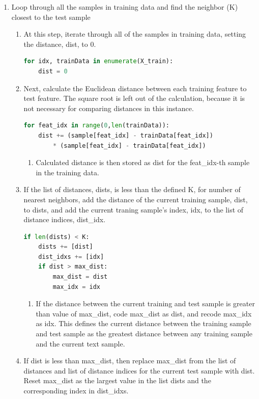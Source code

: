 \documentclass[11pt]{article}
\theoremstyle{definition}
\begin{document}
\begin{enumerate}
\begin{enumerate}
 \item Loop through all the samples in training data and find the neighbor (\textsf{K}) closest to the test sample
 \begin{enumerate}
     \item At this step, iterate through all of the samples in training data, setting the distance, \textsf{dist}, to 0.
\begin{lstlisting}[language=python, frame=single]
for idx, trainData in enumerate(X_train):
	dist = 0
\end{lstlisting}
     \item Next, calculate the Euclidean distance between each training feature to test feature. The square root is left out of the calculation, because it is not necessary for comparing distances in this instance. 
\begin{lstlisting}[language=python, frame=single]
for feat_idx in range(0,len(trainData)):
    dist += (sample[feat_idx] - trainData[feat_idx]) 
        * (sample[feat_idx] - trainData[feat_idx])
\end{lstlisting}
     \begin{enumerate}
     \item Calculated distance is then stored as \textsf{dist} for the \textsf{feat\_idx}-th sample in the training data.
     \end{enumerate}
    \item If the list of distances, \textsf{dists}, is less than the defined \textsf{K}, for number of nearest neighbors, add the distance of the current training sample, \textsf{dist}, to \textsf{dists}, and add the current traning sample's index, \textsf{idx}, to the list of distance indices, \textsf{dist\_idx}.
\begin{lstlisting}[language=python, frame=single]
if len(dists) < K:
    dists += [dist]
    dist_idxs += [idx]
    if dist > max_dist:
    	max_dist = dist
    	max_idx = idx
\end{lstlisting}
    \begin{enumerate}
        \item If the distance between the current training and test sample is greater than value of \textsf{max\_dist}, code \textsf{max\_dist} as \textsf{dist}, and recode \textsf{max\_idx} as \textsf{idx}. This defines the current distance between the training sample and test sample as the greatest distance between any training sample and the current text sample.
    \end{enumerate}
    \item If \textsf{dist} is less than \textsf{max\_dist}, then replace \textsf{max\_dist} from the list of distances and list of distance indices for the current test sample with \textsf{dist}. Reset \textsf{max\_dist} as the largest value in the list \textsf{dists} and the corresponding index in \textsf{dist\_idxs}.

\end{enumerate}
\end{enumerate}
\end{enumerate}
\end{document}
